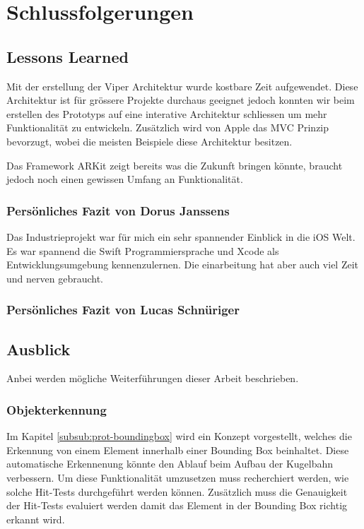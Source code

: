 \section{Schlussfolgerungen}

\subsection{Lessons Learned}
Mit der erstellung der Viper Architektur wurde kostbare Zeit aufgewendet. Diese Architektur ist für grössere Projekte durchaus geeignet jedoch konnten wir beim erstellen des Prototyps auf eine interative Architektur schliessen um mehr Funktionalität zu entwickeln. Zusätzlich wird von Apple das MVC Prinzip bevorzugt, wobei die meisten Beispiele diese Architektur besitzen.

Das Framework ARKit zeigt bereits was die Zukunft bringen könnte, braucht jedoch noch einen gewissen Umfang an Funktionalität.

\subsubsection{Persönliches Fazit von Dorus Janssens}
Das Industrieprojekt war für mich ein sehr spannender Einblick in die iOS Welt. Es war spannend die Swift Programmiersprache und Xcode als Entwicklungsumgebung kennenzulernen. Die einarbeitung hat aber auch viel Zeit und nerven gebraucht. 

\subsubsection{Persönliches Fazit von Lucas Schnüriger}


\subsection{Ausblick}

Anbei werden mögliche Weiterführungen dieser Arbeit beschrieben.

\subsubsection{Objekterkennung}
Im Kapitel \ref{subsub:prot-boundingbox} wird ein Konzept vorgestellt, welches die Erkennung von einem Element innerhalb einer Bounding Box beinhaltet. Diese automatische Erkennenung könnte den Ablauf beim Aufbau der Kugelbahn verbessern. Um diese Funktionalität umzusetzen muss recherchiert werden, wie solche Hit-Tests durchgeführt werden können. Zusätzlich muss die Genauigkeit der Hit-Tests evaluiert werden damit das Element in der Bounding Box richtig erkannt wird.

